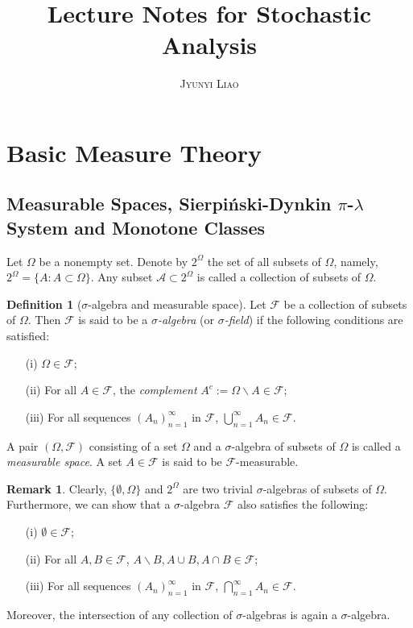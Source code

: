 \documentclass{article}
\title{\bf Lecture Notes for Stochastic Analysis}
\author{\textsc{Jyunyi Liao}}
\date{}
\numberwithin{equation}{section}
\theoremstyle{plain}
\theoremstyle{definition}
\newtheorem{definition}[theorem]{Definition}
\newtheorem*{remark}{Remark}
\begin{document}
\maketitle
\tableofcontents
\newpage
\section{Basic Measure Theory}
\subsection{Measurable Spaces, Sierpiński-Dynkin $\pi$-$\lambda$ System and Monotone Classes}
Let $\Omega$ be a nonempty set. Denote by $2^\Omega$ the set of all subsets of $\Omega$, namely, $2^\Omega=\{A:A\subset\Omega\}$. Any subset $\mathscr{A}\subset 2^\Omega$ is called a collection of subsets of $\Omega$.

\begin{definition}[$\sigma$-algebra and measurable space]\label{def:1.1}
Let $\mathscr{F}$ be a collection of subsets of $\Omega$. Then $\mathscr{F}$ is said to be a \textit{$\sigma$-algebra} (or \textit{$\sigma$-field}) if the following conditions are satisfied:
\begin{itemize}
	\item[(i)] $\Omega\in\mathscr{F}$;
	\item[(ii)] For all $A\in\mathscr{F}$, the \textit{complement} $A^c:=\Omega\backslash A\in \mathscr{F}$;
	\item[(iii)] For all sequences $(A_n)_{n=1}^\infty$ in $\mathscr{F}$, $\bigcup_{n=1}^\infty A_n\in\mathscr{F}$.
\end{itemize}

A pair $(\Omega,\mathscr{F})$ consisting of a set $\Omega$ and a $\sigma$-algebra of subsets of $\Omega$ is called a \textit{measurable space}. A set $A\in\mathscr{F}$ is said to be $\mathscr{F}$-measurable.
\end{definition}

\begin{remark} Clearly, $\{\emptyset,\Omega\}$ and $2^\Omega$ are two trivial $\sigma$-algebras of subsets of $\Omega$. Furthermore, we can show that a $\sigma$-algebra $\mathscr{F}$ also satisfies the following:
\begin{itemize}
	\item[(i)] $\emptyset\in\mathscr{F}$;
	\item[(ii)] For all $A,B\in\mathscr{F}$, $A\backslash B,A\cup B,A\cap B\in\mathscr{F}$;
	\item[(iii)] For all sequences $(A_n)_{n=1}^\infty$ in $\mathscr{F}$, $\bigcap_{n=1}^\infty A_n\in\mathscr{F}$.
\end{itemize}
Moreover, the intersection of any collection of $\sigma$-algebras is again a $\sigma$-algebra.
\end{remark}
\end{document}
